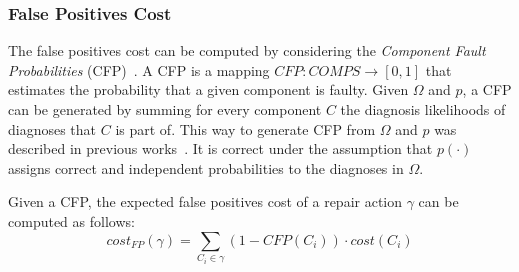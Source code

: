 \subsubsection{False Positives Cost}
The false positives cost can be computed by considering the {\em Component Fault Probabilities} (CFP)~\cite{stern2013findingAll}.
A CFP is a mapping $CFP:COMPS\rightarrow [0,1]$ that estimates the probability that a given component is faulty. 
Given $\Omega$ and $p$, a CFP can be generated by summing for every component $C$ the diagnosis likelihoods of diagnoses that $C$ is part of. 
This way to generate CFP from $\Omega$ and $p$ was described in previous works~\cite{zamir2014using,feldman2013model,stern2013findingAll}. It is correct under the assumption that $p(\cdot)$ assigns correct and independent probabilities to the diagnoses in $\Omega$.

Given a CFP, the expected false positives cost of a repair action $\gamma$ can be computed as follows:
\[ cost_{FP}(\gamma)=\sum_{C_i\in \gamma} (1-CFP(C_i))\cdot cost(C_i) \]


